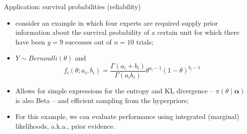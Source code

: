 \begin{frame}{Application: survival probabilities (reliability)}
 \begin{itemize}
  \item \cite{savchuk1994} consider an example in which four experts are required supply prior information about the survival probability of
a certain unit for which there have been $y = 9$ successes out of $n = 10$ trials;
  \item $Y\sim Bernoulli(\theta)$ and
  \[f_i(\theta;a_i, b_i) = \frac{\Gamma(a_i + b_i)}{\Gamma(a_i b_i)} \theta^{a_i-1}(1-\theta)^{b_i-1}\]
  \item Allows for simple expressions for the entropy and KL divergence -- $\pi(\theta \mid \boldsymbol\alpha)$ is also Beta -- and efficient sampling from the hyperpriors; 
  \item For this example, we can evaluate performance using integrated (marginal) likelihoods, a.k.a., prior evidence.
 \end{itemize}
\end{frame}
